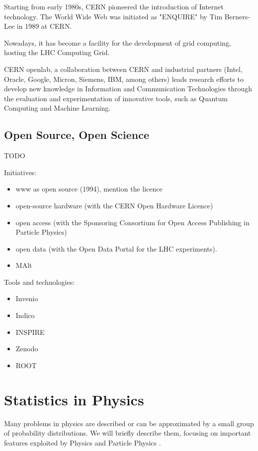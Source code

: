Starting from early 1980s, CERN pioneered the introduction of Internet technology. The World Wide Web was initiated as "ENQUIRE" by Tim Berners-Lee in 1989 at CERN.

Nowadays, it has become a facility for the development of grid computing, hosting the LHC Computing Grid.

CERN openlab, a collaboration between CERN and industrial partners (Intel, Oracle, Google, Micron, Siemens, IBM, among others) leads research efforts to develop new knowledge in Information and Communication Technologies through the evaluation and experimentation of innovative tools, such as Quantum Computing and Machine Learning.

\subsection{Open Source, Open Science}

TODO

Initiatives:

\begin{itemize}
	\item www as open source (1994), mention the licence
	\item open-source hardware (with the CERN Open Hardware Licence)
	\item open access (with the Sponsoring Consortium for Open Access Publishing in Particle Physics)
	\item open data (with the Open Data Portal for the LHC experiments).
	\item MAlt
\end{itemize}

Tools and technologies:

\begin{itemize}
	\item Invenio
	\item Indico
	\item INSPIRE
	\item Zenodo
	\item ROOT
\end{itemize}
\section{Statistics in Physics}

Many problems in physics are described or can be approximated by a small group of probability distributions. We will briefly describe them, focusing on important features exploited by Physics and Particle Physics \cite{leo2012techniques}.

